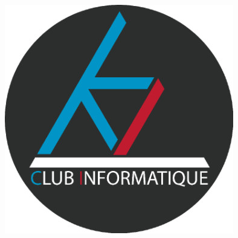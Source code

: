 \documentclass{../templates/enpc-ki/ki020}
\begin{document}
    \begin{figure}[H]
      \centering
      \includegraphics[width=10cm]{page2}
    \end{figure}
\end{document}
